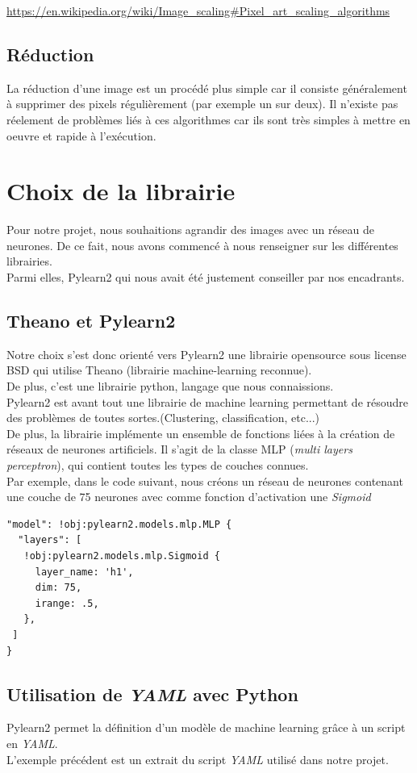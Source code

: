\documentclass[12pt, a4paper]{article}
\begin{document}
\url{https://en.wikipedia.org/wiki/Image_scaling#Pixel_art_scaling_algorithms}

\subsection{Réduction}

La réduction d'une image est un procédé plus simple car il consiste généralement à supprimer des pixels régulièrement (par exemple un sur deux). Il n'existe pas réelement de problèmes liés à ces algorithmes car ils sont très simples à mettre en oeuvre et rapide à l'exécution.


\section{Choix de la librairie}
Pour notre projet, nous souhaitions agrandir des images avec un réseau de neurones. De ce fait, nous avons commencé à nous renseigner sur les différentes librairies. \\ Parmi elles, Pylearn2 qui nous avait été justement conseiller par nos encadrants. 
\subsection{Theano et Pylearn2}
Notre choix s'est donc orienté vers Pylearn2 une librairie opensource sous license BSD qui utilise Theano (librairie machine-learning reconnue).
\\ De plus, c'est une librairie python, langage que nous connaissions.
\\

Pylearn2 est avant tout une librairie de machine learning permettant de résoudre des problèmes de toutes sortes.(Clustering, classification, etc...)
\\De plus, la librairie implémente un ensemble de fonctions liées à la création de réseaux de neurones artificiels. Il s'agit de la classe MLP (\emph{multi layers perceptron}), qui contient toutes les types de couches connues. \\ Par exemple, dans le code suivant, nous créons un réseau de neurones contenant une couche de 75 neurones avec comme fonction d'activation une \emph{Sigmoid}
\begin{verbatim}
"model": !obj:pylearn2.models.mlp.MLP {
  "layers": [
   !obj:pylearn2.models.mlp.Sigmoid {
     layer_name: 'h1',
     dim: 75,
     irange: .5,
   },
 ]
}
\end{verbatim}
\subsection{Utilisation de \emph{YAML} avec Python}
Pylearn2 permet la définition d'un modèle de machine learning grâce à un script en \emph{YAML}.\\ L'exemple précédent est un extrait du script \emph{YAML} utilisé dans notre projet. 
\\
\end{document}
